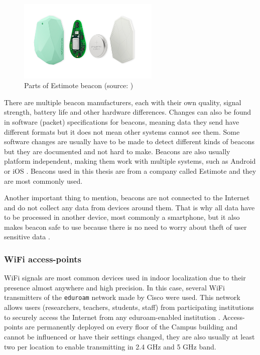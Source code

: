 \begin{figure}[H]
	\begin{centering}
		\includegraphics[width=0.6\textwidth]{img/estimote_beacon}
		\par\end{centering}
	\caption{Parts of Estimote beacon (source: \cite{RMPFEB})\label{fig:PartsOfEstimoteBeacon}}
	\label{fig02c05}
\end{figure}

There are multiple beacon manufacturers, each with their own quality, signal strength, battery life and other hardware differences. Changes can also be found in software (packet) specifications for beacons, meaning data they send have different formats but it does not mean other systems cannot see them. Some software changes are usually have to be made to detect different kinds of beacons but they are documented and not hard to make. Beacons are also usually platform independent, making them work with multiple systems, such as Android or iOS \cite{IPSBOBLE, 10TABB}. Beacons used in this thesis are from a company called Estimote and they are most commonly used.

Another important thing to mention, beacons are not connected to the Internet and do not collect any data from devices around them. That is why all data have to be processed in another device, most commonly a smartphone, but it also makes beacon safe to use because there is no need to worry about theft of user sensitive data \cite{10TABB}.

\subsubsection{WiFi access-points}\label{subsec:WiFiAccessPoints}
WiFi signals are most common devices used in indoor localization due to their presence almost anywhere and high precision. In this case, several WiFi transmitters of the \verb|eduroam| network made by Cisco were used. This network allows users (researchers, teachers, students, staff) from participating institutions to securely access the Internet from any eduroam-enabled institution \cite{Eduroam}. Access-points are permanently deployed on every floor of the Campus building and cannot be influenced or have their settings changed, they are also usually at least two per location to enable transmitting in 2.4 GHz and 5 GHz band.


